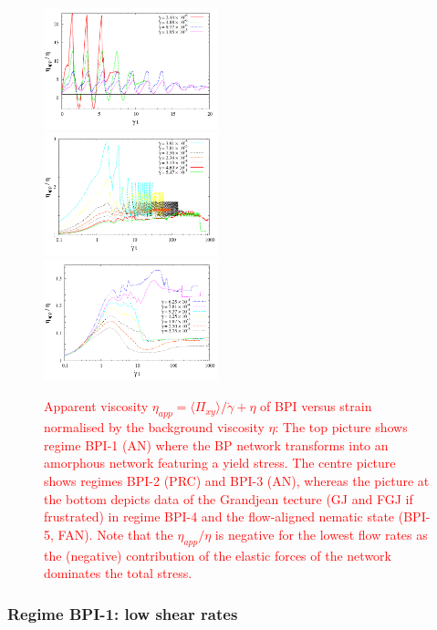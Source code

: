 \documentclass[8.5pt,twoside,twocolumn]{article}
\newcommand{\rev}[1]{{\textcolor{red}{#1}}}
\begin{document}
\begin{figure}[htpb]
\includegraphics[width=0.45\textwidth]{app_visc_strain_bp1_a.pdf}\\
\includegraphics[width=0.45\textwidth]{app_visc_strain_bp1_b.pdf}\\
\includegraphics[width=0.45\textwidth]{app_visc_strain_bp1_c.pdf}
\caption{
\rev{
Apparent viscosity $\eta_{app}=\langle \Pi_{xy}\rangle/\dot{\gamma} + \eta$ of BPI versus strain normalised by the background viscosity $\eta$: 
The top picture shows regime BPI-1 (AN) where
the BP network transforms into an amorphous network featuring a yield stress.
The centre picture shows regimes BPI-2 (PRC) and BPI-3 (AN), 
whereas the picture at the bottom
depicts data of the Grandjean tecture (GJ and FGJ if frustrated) in regime BPI-4 
and the flow-aligned nematic state (BPI-5, FAN). 
Note that the $\eta_{app}/\eta$ is negative for the lowest 
flow rates as the (negative) contribution of the elastic forces
of the network dominates the total stress.
}
}
\label{bp1-appvisc}
\end{figure}


\subsubsection{Regime BPI-1: low shear rates }
\end{document}

